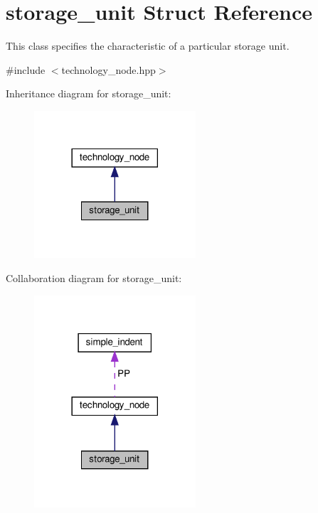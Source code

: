 \hypertarget{structstorage__unit}{}\section{storage\+\_\+unit Struct Reference}
\label{structstorage__unit}


This class specifies the characteristic of a particular storage unit.  




{\ttfamily \#include $<$technology\+\_\+node.\+hpp$>$}



Inheritance diagram for storage\+\_\+unit\+:
\nopagebreak
\begin{figure}[H]
\begin{center}
\leavevmode
\includegraphics[width=170pt]{d4/d3d/structstorage__unit__inherit__graph}
\end{center}
\end{figure}


Collaboration diagram for storage\+\_\+unit\+:
\nopagebreak
\begin{figure}[H]
\begin{center}
\leavevmode
\includegraphics[width=170pt]{d7/d3e/structstorage__unit__coll__graph}
\end{center}
\end{figure}
